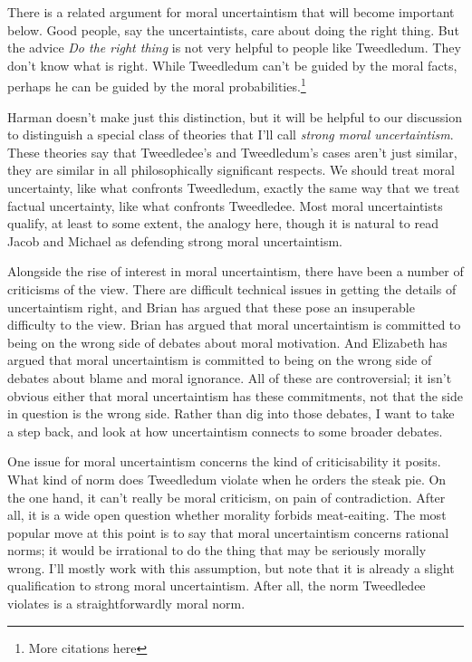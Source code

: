 There is a related argument for moral uncertaintism that will become important below. Good people, say the uncertaintists, care about doing the right thing. But the advice \emph{Do the right thing} is not very helpful to people like Tweedledum. They don't know what is right. While Tweedledum can't be guided by the moral facts, perhaps he can be guided by the moral probabilities.\footnote{More citations here}

Harman doesn't make just this distinction, but it will be helpful to our discussion to distinguish a special class of theories that I'll call \emph{strong moral uncertaintism}. These theories say that Tweedledee's and Tweedledum's cases aren't just similar, they are similar in all philosophically significant respects. We should treat moral uncertainty, like what confronts Tweedledum, exactly the same way that we treat factual uncertainty, like what confronts Tweedledee. Most moral uncertaintists qualify, at least to some extent, the analogy here, though it is natural to read Jacob \citet{Ross2006} and Michael \citet{Smith2009} as defending strong moral uncertaintism.

Alongside the rise of interest in moral uncertaintism, there have been a number of criticisms of the view. There are difficult technical issues in getting the details of uncertaintism right, and Brian \citet{Hedden201x} has argued that these pose an insuperable difficulty to the view. Brian \citet{Weatherson201x} has argued that moral uncertaintism is committed to being on the wrong side of debates about moral motivation. And Elizabeth \citet{Harman201x} has argued that moral uncertaintism is committed to being on the wrong side of debates about blame and moral ignorance. All of these are controversial; it isn't obvious either that moral uncertaintism has these commitments, not that the side in question is the wrong side. Rather than dig into those debates, I want to take a step back, and look at how uncertaintism connects to some broader debates.

One issue for moral uncertaintism concerns the kind of criticisability it posits. What kind of norm does Tweedledum violate when he orders the steak pie. On the one hand, it can't really be moral criticism, on pain of contradiction. After all, it is a wide open question whether morality forbids meat-eaiting. The most popular move at this point is to say that moral uncertaintism concerns rational norms; it would be irrational to do the thing that may be seriously morally wrong. I'll mostly work with this assumption, but note that it is already a slight qualification to strong moral uncertaintism. After all, the norm Tweedledee violates is a straightforwardly moral norm.

